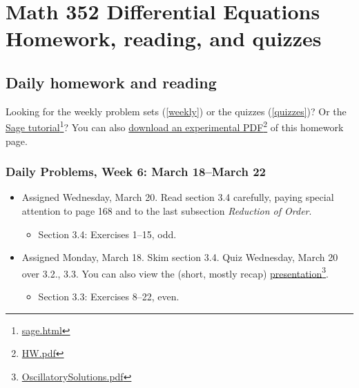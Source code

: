 \def\encoding{UTF-8}

\def\mytitle{Math 352 Homework and Quiz Schedule}
\def\myauthor{Dave Rosoff}
\def\mydate{February 6, 2013}
\def\htmlheaderlevel{1}
\def\latexmode{article}

\chapter{Math 352 Differential Equations  Homework, reading, and quizzes}
\label{math352differentialequationsbrhomeworkreadingandquizzes}

\section{Daily homework and reading}
\label{daily}

Looking for the weekly problem sets (\autoref{weekly}) or the quizzes (\autoref{quizzes})? Or the \href{sage.html}{Sage tutorial}\footnote{\href{sage.html}{sage.html}}? You can also \href{HW.pdf}{download an experimental PDF}\footnote{\href{HW.pdf}{HW.pdf}} of this homework page.

\subsection{Daily Problems, Week 6: March 18--March 22}
\label{dailyproblemsweek6:march18--march22}

\begin{itemize}
\item Assigned Wednesday, March 20. Read section 3.4 carefully, paying special attention to page 168 and to the last subsection \emph{Reduction of Order}.

\begin{itemize}
\item Section 3.4: Exercises 1--15, odd.

\end{itemize}

\item Assigned Monday, March 18. Skim section 3.4. Quiz Wednesday, March 20 over 3.2., 3.3. You can also view the (short, mostly recap) \href{OscillatorySolutions.pdf}{presentation}\footnote{\href{OscillatorySolutions.pdf}{OscillatorySolutions.pdf}}.

\begin{itemize}
\item Section 3.3: Exercises 8--22, even.

\end{itemize}

\end{itemize}

